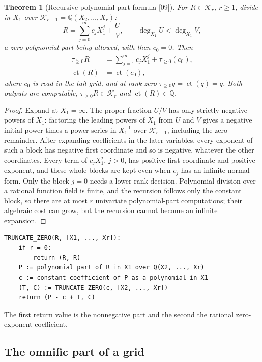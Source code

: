 \documentclass[11pt,oneside]{article}
\numberwithin{equation}{section}
\newtheorem{theorem}{Theorem}[section]
\theoremstyle{definition}
\theoremstyle{remark}
\newcommand{\Q}{\mathbb Q}
\newcommand{\KG}{\mathcal K}
\newcommand{\ct}{\operatorname{ct}}
\newcommand{\tr}[1]{\tau_{\ge #1}}
\newcommand{\src}[1]{\textup{\textsf{\small[#1]}}}
\begin{document}
\begin{theorem}[Recursive polynomial-part formula \src{09}]\label{onot:grid:thm:polypart}
For $R\in\KG_r$, $r\ge1$, divide in $X_1$ over $\KG_{r-1}=\Q(X_2,\ldots,X_r)$:
\begin{equation}\label{onot:grid:eq:polydiv}
 R=\sum_{j=0}^mc_jX_1^j+\frac UV,\qquad \deg_{X_1}U<\deg_{X_1}V,
\end{equation}
a zero polynomial part being allowed, with then $c_0=0$. Then
\begin{align}
 \tr0R&=\sum_{j=1}^mc_jX_1^j+\tr0(c_0),\label{onot:grid:eq:T}\\
 \ct(R)&=\ct(c_0),\label{onot:grid:eq:C}
\end{align}
where $c_0$ is read in the tail grid, and at rank zero $\tr0q=\ct(q)=q$. Both
outputs are computable, $\tr0R\in\KG_r$ and $\ct(R)\in\Q$.
\end{theorem}
\begin{proof}
Expand at $X_1=\infty$. The proper fraction $U/V$ has only strictly negative
powers of $X_1$: factoring the leading powers of $X_1$ from $U$ and $V$ gives a
negative initial power times a power series in $X_1^{-1}$ over $\KG_{r-1}$,
including the zero remainder. After expanding coefficients in the later variables,
every exponent of such a block has negative first coordinate and so is negative,
whatever the other coordinates. Every term of $c_jX_1^j$, $j>0$, has positive
first coordinate and positive exponent, and these whole blocks are kept even when
$c_j$ has an infinite normal form. Only the block $j=0$ needs a lower-rank
decision. Polynomial division over a rational function field is finite, and the
recursion follows only the constant block, so there are at most $r$ univariate
polynomial-part computations; their algebraic cost can grow, but the recursion
cannot become an infinite expansion.
\end{proof}

\begin{lstlisting}[caption={Truncation at zero on a separated grid (09).},label={onot:grid:lst:truncate}]
TRUNCATE_ZERO(R, [X1, ..., Xr]):
    if r = 0:
        return (R, R)
    P := polynomial part of R in X1 over Q(X2, ..., Xr)
    c := constant coefficient of P as a polynomial in X1
    (T, C) := TRUNCATE_ZERO(c, [X2, ..., Xr])
    return (P - c + T, C)
\end{lstlisting}
The first return value is the nonnegative part and the second the rational
zero-exponent coefficient.

\subsection{The omnific part of a grid}
\end{document}
